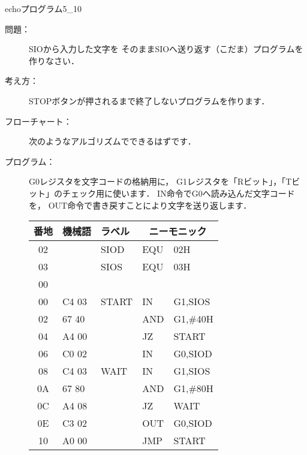 \newpage
\begin{reidai}{echoプログラム}{5_10}
  \begin{description}
  \item[問題：] SIOから入力した文字を
    そのままSIOへ送り返す（こだま）プログラムを作りなさい．

  \item[考え方：]
    STOPボタンが押されるまで終了しないプログラムを作ります．
  \item[フローチャート：]
    次のようなアルゴリズムでできるはずです．

    \begin{center}
    \end{center}

  \item[プログラム：]
    G0レジスタを文字コードの格納用に，
    G1レジスタを「Rビット」，「Tビット」のチェック用に使います．
    IN命令でG0へ読み込んだ文字コードを，
    OUT命令で書き戻すことにより文字を送り返します．

    {\ttfamily\footnotesize\begin{center}
      \begin{tabular}{|c|l|l|l l|} \hline
        番地 & 機械語 & ラベル & \multicolumn{2}{|c|}{ニーモニック} \\
        \hline
        02 &       & SIOD  & EQU & 02H            \\
        03 &       & SIOS  & EQU & 03H            \\
        00 &       &       &     &                \\
        00 & C4 03 & START & IN  & G1,SIOS        \\
        02 & 67 40 &       & AND & G1,\#40H       \\
        04 & A4 00 &       & JZ  & START          \\
        06 & C0 02 &       & IN  & G0,SIOD        \\
        08 & C4 03 & WAIT  & IN  & G1,SIOS        \\
        0A & 67 80 &       & AND & G1,\#80H       \\
        0C & A4 08 &       & JZ  & WAIT           \\
        0E & C3 02 &       & OUT & G0,SIOD        \\
        10 & A0 00 &       & JMP & START          \\
        \hline
      \end{tabular}
    \end{center}}
  \end{description}
\end{reidai}

